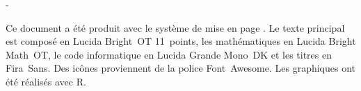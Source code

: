 
\vspace*{\fill}

\begingroup
\calccentering{\unitlength}
\begin{adjustwidth*}{\unitlength}{-\unitlength}
  \begin{flushleft}
    \small %
    Ce document a été produit avec le système de mise en page
    {\XeLaTeX}. Le texte principal est composé en Lucida Bright~OT
    11~points, les mathématiques en Lucida Bright Math~OT, le code
    informatique en Lucida Grande Mono~DK et les titres en Fira~Sans.
    Des icônes proviennent de la police Font~Awesome. Les graphiques
    ont été réalisés avec R.
  \end{flushleft}
\end{adjustwidth*}
\endgroup
\vfill
